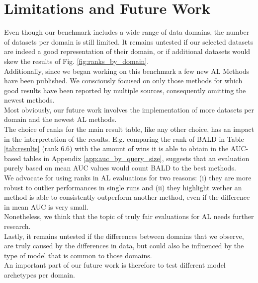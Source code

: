 \documentclass[]{article}
\begin{document}
 \section{Limitations and Future Work}\label{app:future_work}
 Even though our benchmark includes a wide range of data domains, the number of datasets per domain is still limited.
 It remains untested if our selected datasets are indeed a good representation of their domain, or if additional datasets would skew the results of Fig. \ref{fig:ranks_by_domain}. \\ 
 Additionally, since we began working on this benchmark a few new AL Methods have been published.
 We consciously focused on only those methods for which good results have been reported by multiple sources, consequently omitting the newest methods. \\
 Most obviously, our future work involves the implementation of more datasets per domain and the newest AL methods. \\ [1mm]
 The choice of ranks for the main result table, like any other choice, has an impact in the interpretation of the results.
 E.g. comparing the rank of BALD in Table \ref{tab:results} (rank 6.6) with the amount of wins it is able to obtain in the AUC-based tables in Appendix \ref{app:auc_by_query_size}, suggests that an evaluation purely based on mean AUC values would count BALD to the best methods. \\
 We advocate for using ranks in AL evaluations for two reasons: (i) they are more robust to outlier performances in single runs and (ii) they highlight wether an method is able to consistently outperform another method, even if the difference in mean AUC is very small. \\
 Nonetheless, we think that the topic of truly fair evaluations for AL needs further research. \\ [1mm]
 Lastly, it remains untested if the differences between domains that we observe, are truly caused by the differences in data, but could also be influenced by the type of model that is common to those domains. \\
 An important part of our future work is therefore to test different model archetypes per domain.
 
\end{document}
